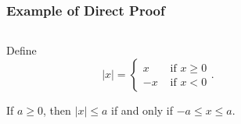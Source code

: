 \documentclass{beamer}
\begin{document}
\begin{frame}
\frametitle{Example of Direct Proof}	
\begin{columns}
\begin{column}{0.5\textwidth}
   Define
   \[
   |x| = \begin{cases} x & \text{~if~} x\geq 0 \\
 					   -x & \text{~if~} x<0
 	     \end{cases}.	
 \]
 
 \begin{theorem}
 If $a\geq 0$, then $|x|\leq a$ if and only if $-a\leq x \leq a$.	
 \end{theorem}


\end{column}
\begin{column}{0.5\textwidth}  
\end{column}
\end{columns}
\end{frame}
\end{document}
